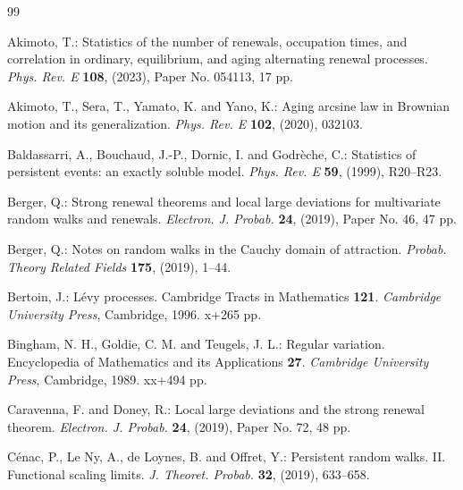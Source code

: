 \documentclass[EJP,preprint]{ejpecp}
\theoremstyle{ejpecpbodyit}
\begin{document}












\appendix


\begin{thebibliography}{99}

 Akimoto, T.: Statistics of the number of renewals,
  occupation times, and correlation in ordinary, equilibrium, and aging
  alternating renewal processes. \emph{Phys. Rev. E} \textbf{108}, (2023),
  Paper No. 054113, 17 pp. 

 Akimoto, T., Sera, T., Yamato, K. and Yano, K.: Aging arcsine law in
  Brownian motion and its generalization. \emph{Phys. Rev. E} \textbf{102}, (2020), 032103.

 Baldassarri, A., Bouchaud, J.-P., Dornic, I. and Godr\`eche, C.:
  Statistics of persistent events: an exactly soluble model. \emph{Phys. Rev. E}
  \textbf{59}, (1999), R20--R23. 

 Berger, Q.: Strong renewal theorems and local large
  deviations for multivariate random walks and renewals. \emph{Electron. J.
  Probab.} \textbf{24}, (2019), Paper No. 46, 47 pp. 

 Berger, Q.: Notes on random walks in the Cauchy domain
  of attraction. \emph{Probab. Theory Related Fields} \textbf{175}, (2019),
  1--44. 

 Bertoin, J.: L\'evy processes. Cambridge Tracts in Mathematics
  \textbf{121}. \emph{Cambridge University Press}, Cambridge, 1996. x+265 pp. 

 Bingham, N. H., Goldie, C. M. and Teugels, J. L.: Regular
  variation. Encyclopedia of Mathematics and its Applications \textbf{27}.
  \emph{Cambridge University Press}, Cambridge, 1989. xx+494 pp.

 Caravenna, F. and Doney, R.: Local large
  deviations and the strong renewal theorem. \emph{Electron. J. Probab.}
  \textbf{24}, (2019), Paper No. 72, 48 pp. 

 C\'enac, P., Le Ny, A., de Loynes, B. and Offret, Y.:
  Persistent random walks. II. Functional scaling limits. \emph{J. Theoret.
  Probab.} \textbf{32}, (2019), 633--658. 


\end{thebibliography}
\end{document}
